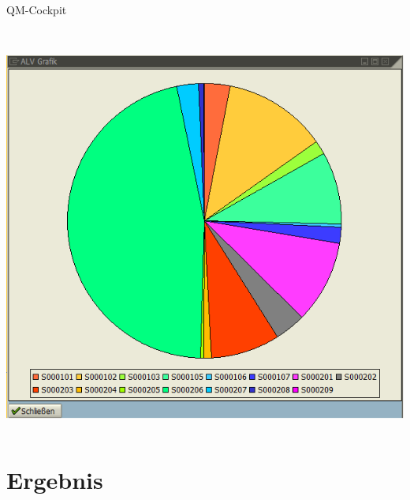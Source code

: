 \begin{frame}{QM-Cockpit}
\begin{columns}
\begin{column}{.5\textwidth}
			\\
 			\includegraphics[width=.95\textwidth]{images/QMCockpit4.png}
		\end{column}
	\end{columns}
\end{frame}

\section{Ergebnis}
